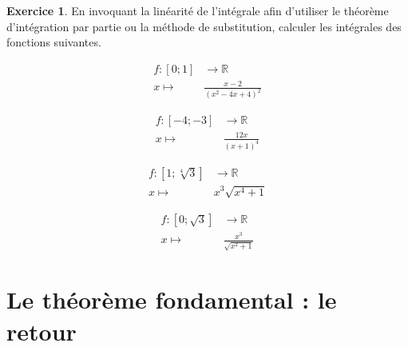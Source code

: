\documentclass[a4paper,fontsize=13pt]{scrreprt}
\theoremstyle{plain}
\theoremstyle{definition}
\newtheorem{exo}[subsection]{Exercice}
\newtheorem*{solu}{Solution}
\newcommand{\rr}{\mathbb{R}}
\begin{document}
\begin{exo}
En invoquant la linéarité de l'intégrale afin d'utiliser le théorème d'intégration par partie ou la méthode de substitution, calculer les intégrales des fonctions suivantes.
\begin{enumerate}
\begin{multicols}{2}
\item \begin{align*}
f : [0;1] &\to \rr \\
x \mapsto& \frac{x-2}{(x^2-4x+4)^2}
\end{align*}
\item \begin{align*}
f : [-4;-3] &\to \rr \\
x \mapsto& \frac{12x}{(x+1)^4}
\end{align*}
\item \begin{align*}
f : [1;\sqrt[4]{3}] &\to \rr \\
x \mapsto& x^3\sqrt{x^4+1}
\end{align*}
\item \begin{align*}
f : [0;\sqrt{3}] &\to \rr \\
x \mapsto& \frac{x^3}{\sqrt{x^2+1}}
\end{align*}
\end{multicols}
\end{enumerate}
\end{exo}

\chapter{Le théorème fondamental : le retour}
\end{document}
